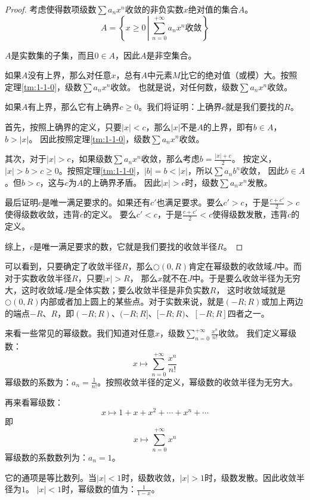 \documentclass[12pt,UTF8,fontset=none]{ctexbook}
\begin{document}
\begin{proof}
    考虑使得数项级数$\sum a_n x^n$收敛的非负实数$x$绝对值的集合$A$。
    $$A = \left\{ x \geqslant 0 \, \left| \, \sum_{n=0}^{+\infty} a_n x^n \mbox{收敛} \right. \right\} $$

    $A$是实数集的子集，而且$0\in A$，因此$A$是非空集合。

    如果$A$没有上界，那么对任意$x$，总有$A$中元素$M$比它的绝对值（或模）大。按照定理\ref{tm:1-1-0}，级数$\sum a_n x^n$收敛。
    也就是说，对任何数，级数$\sum a_n x^n$收敛。

    如果$A$有上界，那么它有上确界$c\geqslant 0$。我们将证明：上确界$c$就是我们要找的$R$。
    
    首先，按照上确界的定义，只要$|x|<c$，那么$|x|$不是$A$的上界，即有$b\in A$，$b>|x|$。
    因此按照定理\ref{tm:1-1-0}，级数$\sum a_n x^n$收敛。

    其次，对于$|x|>c$，如果级数$\sum a_n x^n$收敛，那么考虑$b = \frac{|x| + c}{2}$。
    按定义，$|x| > b > c \geqslant 0$。按照定理\ref{tm:1-1-0}，$|b| = b < |x|$，所以$\sum a_n b^n$收敛，
    因此$b \in A$。但$b>c$，这与$c$为$A$的上确界矛盾。
    因此$|x|>c$时，级数$\sum a_n x^n$发散。

    最后证明$c$是唯一满足要求的。如果还有$c'$也满足要求。要么$c'>c$，于是$\frac{c+c'}{2} > c$使得级数收敛，违背$c$的定义。
    要么$c'<c$，于是$\frac{c+c'}{2} < c$使得级数发散，违背$c$的定义。

    综上，$c$是唯一满足要求的数，它就是我们要找的收敛半径$R$。

\end{proof}

可以看到，只要确定了收敛半径$R$，那么$\bigcirc(0,R)$肯定在幂级数的收敛域$J$中。而对于实数收敛半径$R$，只要$|x|>R$，
那么$x$就不在$J$中。于是要么收敛半径为无穷大，这时收敛域$J$是全体实数；要么收敛半径是非负实数$R$，
这时收敛域就是$\bigcirc(0,R)$内部或者加上圆上的某些点。对于实数来说，就是$(-R;R)$或加上两边的端点$-R$、$R$，即$(-R;R)$、$(-R;R]$、$[-R;R)$、$[-R;R]$四者之一。

来看一些常见的幂级数。我们知道对任意$x$，级数$\sum_{n=0}^{+\infty} \frac{x^n}{n!}$收敛。
我们定义幂级数：
$$ x \mapsto \sum_{n=0}^{+\infty} \frac{x^n}{n!} $$
幂级数的系数为：$a_n = \frac{1}{n!}$。按照收敛半径的定义，幂级数的收敛半径为无穷大。

再来看幂级数：
$$ x \mapsto 1 + x + x^2 + \cdots + x^n + \cdots $$
即
$$ x \mapsto \sum_{n=0}^{+\infty} x^n $$
幂级数的系数数列为：$a_n = 1$。

它的通项是等比数列。当$|x|<1$时，级数收敛，$|x|>1$时，级数发散。因此收敛半径为$1$。
$|x|<1$时，幂级数的值为：$\frac{1}{1 - x}$。
\end{document}
